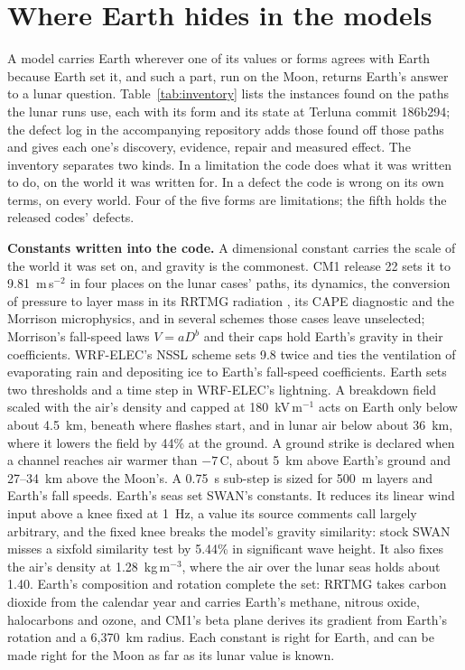 \section{Where Earth hides in the models}

A model carries Earth wherever one of its values or forms agrees with Earth because Earth set it, and
such a part, run on the Moon, returns Earth's answer to a lunar question. Table~\ref{tab:inventory} lists
the instances found on the paths the lunar runs use, each with its form and its state at Terluna commit
186b294; the defect log in the accompanying repository adds those found off those paths and gives each
one's discovery, evidence, repair and measured effect. The inventory separates two kinds. In a limitation
the code does what it was written to do, on the world it was written for. In a defect the code is wrong on
its own terms, on every world. Four of the five forms are limitations; the fifth holds the released codes'
defects.

\textbf{Constants written into the code.} A dimensional constant carries the scale of the world it was
set on, and gravity is the commonest. CM1 release 22 sets it to 9.81~m\,s$^{-2}$ in four places on the
lunar cases' paths, its dynamics, the conversion of pressure to layer mass in its RRTMG radiation
\autocite{iacono2008radiative}, its CAPE diagnostic and the Morrison microphysics, and in several schemes
those cases leave unselected; Morrison's fall-speed laws $V = aD^b$ and their caps hold Earth's gravity in
their coefficients. WRF-ELEC's NSSL scheme sets 9.8 twice and ties the ventilation of
evaporating rain and depositing ice to Earth's fall-speed coefficients. Earth sets two thresholds
and a time step in WRF-ELEC's lightning. A breakdown field scaled with the air's density
\autocite{dwyer2003fundamental} and capped at 180~kV\,m$^{-1}$ acts on Earth only below about 4.5~km,
beneath where flashes start, and in lunar air below about 36~km, where it lowers the field by 44\% at the
ground. A ground strike is declared when a channel reaches air warmer than $-7$\,\textdegree C, about 5~km
above Earth's ground and 27--34~km above the Moon's. A 0.75~s sub-step is sized for 500~m layers and
Earth's fall speeds. Earth's seas set SWAN's constants. It reduces its linear wind input above a
knee fixed at 1~Hz, a value its source comments call largely arbitrary, and the fixed knee breaks the
model's gravity similarity: stock SWAN misses a sixfold similarity test by
5.44\% in significant wave height. It also fixes the air's density at 1.28~kg\,m$^{-3}$, where the air over the lunar seas
holds about 1.40. Earth's composition and rotation complete the set: RRTMG takes carbon dioxide
from the calendar year and carries Earth's methane, nitrous oxide, halocarbons and ozone, and CM1's beta
plane derives its gradient from Earth's rotation and a 6,370~km radius. Each constant is right
for Earth, and can be made right for the Moon as far as its lunar value is known.

